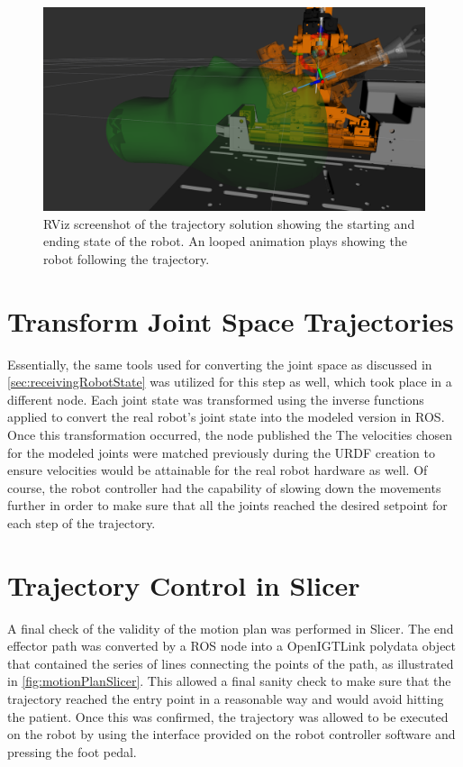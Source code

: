 \documentclass[12pt]{report}
\begin{document}
\begin{figure}[thpb]
	\centering
	\includegraphics[width = \textwidth]{images/motion_plan_rviz.png}
    \caption{RViz screenshot of the trajectory solution showing the starting and ending state of the robot. An looped animation plays showing the robot following the trajectory.}
    \label{fig:motionPlanRViz}
\end{figure}


\section{Transform Joint Space Trajectories}
Essentially, the same tools used for converting the joint space as discussed in \autoref{sec:receivingRobotState} was utilized for this step as well, which took place in a different node. Each joint state was transformed using the inverse functions applied to convert the real robot's joint state into the modeled version in ROS. Once this transformation occurred, the node published the  The velocities chosen for the modeled joints were matched previously during the URDF creation to ensure velocities would be attainable for the real robot hardware as well. Of course, the robot controller had the capability of slowing down the movements further in order to make sure that all the joints reached the desired setpoint for each step of the trajectory. 


\section{Trajectory Control in Slicer}
A final check of the validity of the motion plan was performed in Slicer. The end effector path was converted by a ROS node into a OpenIGTLink polydata object that contained the series of lines connecting the points of the path, as illustrated in \autoref{fig:motionPlanSlicer}. This allowed a final sanity check to make sure that the trajectory reached the entry point in a reasonable way and would avoid hitting the patient. Once this was confirmed, the trajectory was allowed to be executed on the robot by using the interface provided on the robot controller software and pressing the foot pedal.
\end{document}

